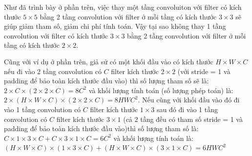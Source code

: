 \documentclass[a4paper,12pt]{report}
\begin{document}
\par Như đã trình bày ở phần trên, việc thay một tầng convoluiton với filter có kích thước $5 \times 5$ bằng 2 tầng convolution với filter ở mỗi tầng có kích thước $3 \times 3$ sẽ giúp giảm tham số, giảm chi phí tính toán. Vậy tại sao không thay 1 tầng convolution với filter có kích thước $3 \times 3$ bằng 2 tầng convolution với filter ở mỗi tầng có kích thước $2 \times 2$.
\par Cũng với ví dụ ở phần trên, giả sử có một khối đầu vào có kích thước $H \times W \times C$ nếu đi vào 2 tầng convolution có $C$ filter kích thước $2 \times 2$ (với stride = 1 và padding để bảo toàn kích thước đầu vào) thì số lượng tham số sẽ là: $2 \times C \times (2 \times 2 \times C) = 8C^2$ và khối lượng tính toán (số lượng phép toán) là: $2 \times (H \times W \times C) \times (2 \times 2 \times C) = 8HWC^2$. Nếu cũng với khối đầu vào đó đi vào 1 tầng convolution có $C$ filter kích thước $1 \times 3 $ sau đó đi vào 1 tầng convolution có $C$ filter kích thước $3 \times 1$ (cả 2 tầng đều có tham số stride = 1 và padding để bảo toàn kích thước đầu vào)thì số lượng tham số là: $C \times 1 \times 3 \times C+ C \times 3 \times 1 \times C = 6C^2$ và khối lượng tính toán là: $(H \times W \times C) \times (1 \times 3 \times C) + (H \times W \times C) \times (3 \times 1 \times C) = 6HWC^2$
\end{document}

